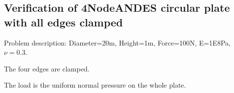 \documentclass[fleqn,11pt,letter]{article}
\begin{document}

























\newpage
\subsection{Verification of 4NodeANDES circular plate with all edges clamped}

Problem description: Diameter=20m, Height=1m, Force=100N, E=1E8Pa, $\nu=0.3$. 

The four edges are clamped. 

The load is the uniform normal pressure on the whole plate. 
\end{document}
